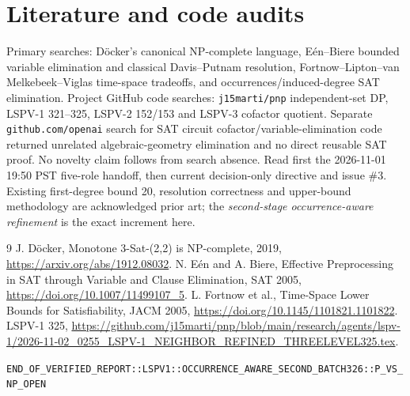 \documentclass[11pt]{article}
\begin{document}
\section{Literature and code audits}
Primary searches: D\"ocker's canonical NP-complete language, E\'en--Biere bounded variable elimination and classical Davis--Putnam resolution, Fortnow--Lipton--van Melkebeek--Viglas time-space tradeoffs, and occurrences/induced-degree SAT elimination. Project GitHub code searches: \texttt{j15marti/pnp} independent-set DP, LSPV-1 321--325, LSPV-2 152/153 and LSPV-3 cofactor quotient. Separate \texttt{github.com/openai} search for SAT circuit cofactor/variable-elimination code returned unrelated algebraic-geometry elimination and no direct reusable SAT proof. No novelty claim follows from search absence. Read first the 2026-11-01 19:50 PST five-role handoff, then current decision-only directive and issue \#3. Existing first-degree bound 20, resolution correctness and upper-bound methodology are acknowledged prior art; the \emph{second-stage occurrence-aware refinement} is the exact increment here.
\begin{thebibliography}{9}
 J. D\"ocker, Monotone 3-Sat-(2,2) is NP-complete, 2019, \url{https://arxiv.org/abs/1912.08032}.
 N. E\'en and A. Biere, Effective Preprocessing in SAT through Variable and Clause Elimination, SAT 2005, \url{https://doi.org/10.1007/11499107_5}.
 L. Fortnow et al., Time-Space Lower Bounds for Satisfiability, JACM 2005, \url{https://doi.org/10.1145/1101821.1101822}.
 LSPV-1 325, \url{https://github.com/j15marti/pnp/blob/main/research/agents/lspv-1/2026-11-02_0255_LSPV-1_NEIGHBOR_REFINED_THREELEVEL325.tex}.
\end{thebibliography}
\noindent\texttt{END\_OF\_VERIFIED\_REPORT::LSPV1::OCCURRENCE\_AWARE\_SECOND\_BATCH326::P\_VS\_NP\_OPEN}
\end{document}
